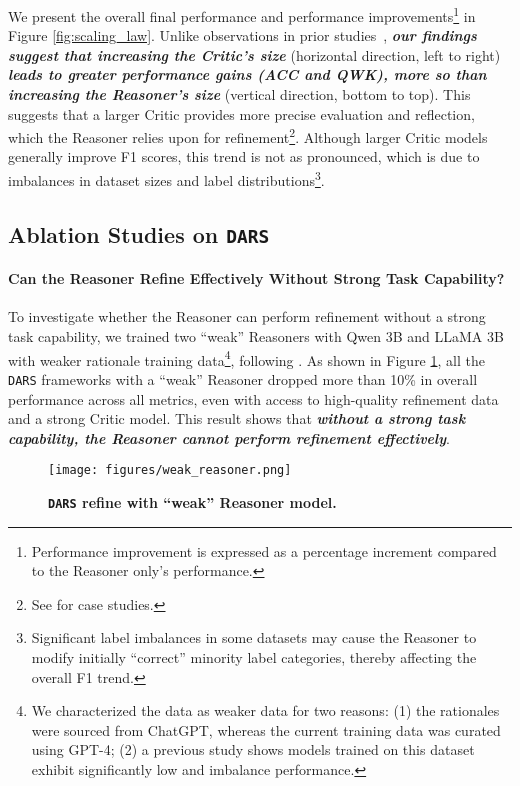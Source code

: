 \noindent We present the overall final performance and performance improvements\footnote{Performance improvement is expressed as a percentage increment compared to the Reasoner only's performance.} in Figure \ref{fig:scaling_law}. Unlike observations in prior studies~\citep{welleck2023generating, akyurek-etal-2023-rl4f, paul-etal-2024-refiner}, \textbf{\emph{our findings suggest that increasing the Critic's size}} (horizontal direction, left to right) \textbf{\emph{leads to greater performance gains (ACC and QWK), more so than increasing the Reasoner's size}} (vertical direction, bottom to top). This suggests that a larger Critic provides more precise evaluation and reflection, which the Reasoner relies upon for refinement\footnote{See \textsection{\ref{sec:compare_critic_sizes}} for case studies.}. Although larger Critic models generally improve F1 scores, this trend is not as pronounced, which is due to imbalances in dataset sizes and label distributions\footnote{Significant label imbalances in some datasets may cause the Reasoner to modify initially ``correct'' minority label categories, thereby affecting the overall F1 trend.}.

\subsection{Ablation Studies on \texttt{DARS}}
\paragraph{Can the Reasoner Refine Effectively Without Strong Task Capability?}
To investigate whether the Reasoner can perform refinement without a strong task capability, we trained two ``weak'' Reasoners with Qwen 3B and LLaMA 3B with weaker rationale training data\footnote{We characterized the data as weaker data for two reasons: (1) the rationales were sourced from ChatGPT, whereas the current training data was curated using GPT-4; (2) a previous study \cite{li_emnlp2024} shows models trained on this dataset exhibit significantly low and imbalance performance.}, following \citet{li_emnlp2023}.
As shown in Figure \ref{fig:weak_reasoner}, all the \texttt{DARS} frameworks with a ``weak'' Reasoner dropped more than 10\% in overall performance across all metrics, even with access to high-quality refinement data and a strong Critic model. %
This result shows that \textbf{\emph{without a strong task capability, the Reasoner cannot perform refinement effectively}}.
\begin{figure}[!h]
\centering
\vspace{-2mm}
\texttt{[image: figures/weak\_reasoner.png]}
\vspace{-2mm}
\caption{\small \textbf{\texttt{DARS} refine with ``weak'' Reasoner model.}}
\label{fig:weak_reasoner}\vspace{-6mm}
\end{figure}

